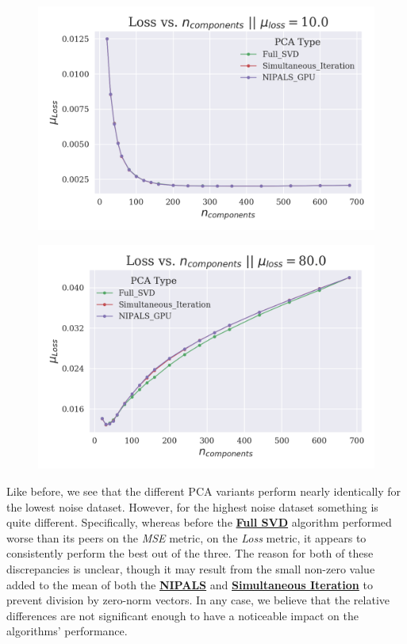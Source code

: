 \documentclass[12pt]{article}
\begin{document}
\begin{figure}[H]
\centering
\begin{minipage}{.45\textwidth}
  \centering
  \includegraphics[width=\linewidth]{Noise10Loss.png}
  \label{Noise10Loss}
\end{minipage}%
\quad
\begin{minipage}{.45\textwidth}
  \centering
  \includegraphics[width=\linewidth]{Noise80Loss.png}
  \label{Noise80Loss}
\end{minipage}
\end{figure}

Like before, we see that the different PCA variants perform nearly identically for the lowest noise dataset. However, for the highest noise dataset something is quite different. Specifically, whereas before the \textbf{\hyperref[3.2]{Full SVD}} algorithm performed worse than its peers on the \textit{MSE} metric, on the \textit{Loss} metric, it appears to consistently perform the best out of the three. The reason for both of these discrepancies is unclear, though it may result from the small non-zero value added to the mean of both the \textbf{\hyperref[3.1]{NIPALS}} and  \textbf{\hyperref[3.3]{Simultaneous Iteration}} to prevent division by zero-norm vectors. In any case, we believe that the relative differences are not significant enough to have a noticeable impact on the algorithms' performance. 
\end{document}
